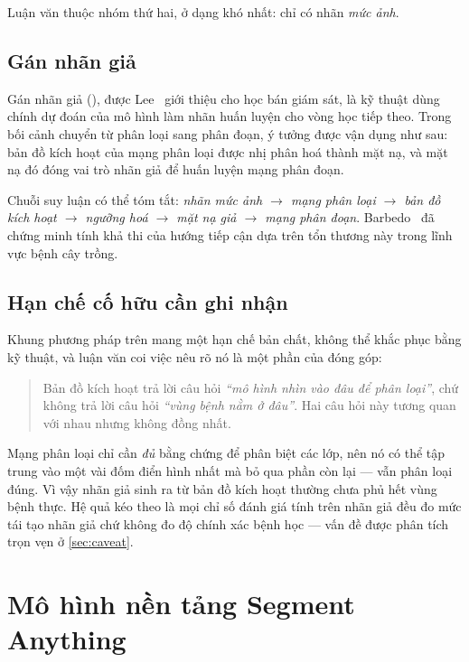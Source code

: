 Luận văn thuộc nhóm thứ hai, ở dạng khó nhất: chỉ có nhãn \emph{mức ảnh}.

\subsection{Gán nhãn giả}

Gán nhãn giả (), được Lee~\cite{lee2013pseudolabel} giới thiệu
cho học bán giám sát, là kỹ thuật dùng chính dự đoán của mô hình làm nhãn huấn
luyện cho vòng học tiếp theo. Trong bối cảnh chuyển từ phân loại sang phân đoạn,
ý tưởng được vận dụng như sau: bản đồ kích hoạt của mạng phân loại được nhị phân
hoá thành mặt nạ, và mặt nạ đó đóng vai trò nhãn giả để huấn luyện mạng phân đoạn.

Chuỗi suy luận có thể tóm tắt: \emph{nhãn mức ảnh $\rightarrow$ mạng phân loại
$\rightarrow$ bản đồ kích hoạt $\rightarrow$ ngưỡng hoá $\rightarrow$ mặt nạ giả
$\rightarrow$ mạng phân đoạn}. Barbedo~\cite{barbedo2019lesions} đã chứng minh
tính khả thi của hướng tiếp cận dựa trên tổn thương này trong lĩnh vực bệnh cây
trồng.

\subsection{Hạn chế cố hữu cần ghi nhận}

Khung phương pháp trên mang một hạn chế bản chất, không thể khắc phục bằng kỹ
thuật, và luận văn coi việc nêu rõ nó là một phần của đóng góp:

\begin{quote}
Bản đồ kích hoạt trả lời câu hỏi \emph{``mô hình nhìn vào đâu để phân loại''}, chứ
không trả lời câu hỏi \emph{``vùng bệnh nằm ở đâu''}. Hai câu hỏi này tương quan
với nhau nhưng không đồng nhất.
\end{quote}

Mạng phân loại chỉ cần \emph{đủ} bằng chứng để phân biệt các lớp, nên nó có thể
tập trung vào một vài đốm điển hình nhất mà bỏ qua phần còn lại --- vẫn phân loại
đúng. Vì vậy nhãn giả sinh ra từ bản đồ kích hoạt thường chưa phủ hết vùng bệnh
thực. Hệ quả kéo theo là mọi chỉ số đánh giá tính trên nhãn giả đều đo mức tái
tạo nhãn giả chứ không đo độ chính xác bệnh học --- vấn đề được phân tích trọn vẹn
ở \cref{sec:caveat}.

\section{Mô hình nền tảng Segment Anything}
\label{sec:sam}

